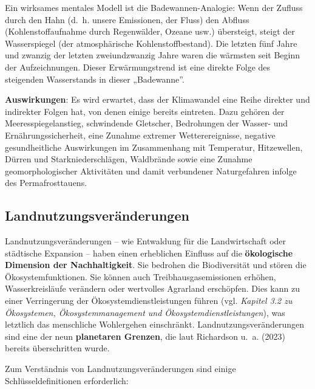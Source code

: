 \documentclass[
  nswissgerman,
  a4paper,
  openany]{book}
\begin{document}
Ein wirksames mentales Modell ist die Badewannen-Analogie: Wenn der
Zufluss durch den Hahn (d.~h. unsere Emissionen, der Fluss) den Abfluss
(Kohlenstoffaufnahme durch Regenwälder, Ozeane usw.) übersteigt, steigt
der Wasserspiegel (der atmosphärische Kohlenstoffbestand). Die letzten
fünf Jahre und zwanzig der letzten zweiundzwanzig Jahre waren die
wärmsten seit Beginn der Aufzeichnungen. Dieser Erwärmungstrend ist eine
direkte Folge des steigenden Wasserstands in dieser „Badewanne''.

\textbf{Auswirkungen}: Es wird erwartet, dass der Klimawandel eine Reihe
direkter und indirekter Folgen hat, von denen einige bereits eintreten.
Dazu gehören der Meeresspiegelanstieg, schwindende Gletscher,
Bedrohungen der Wasser- und Ernährungssicherheit, eine Zunahme extremer
Wetterereignisse, negative gesundheitliche Auswirkungen im Zusammenhang
mit Temperatur, Hitzewellen, Dürren und Starkniederschlägen, Waldbrände
sowie eine Zunahme geomorphologischer Aktivitäten und damit verbundener
Naturgefahren infolge des Permafrosttauens.

\subsection{Landnutzungsveränderungen}\label{landnutzungsveruxe4nderungen}

Landnutzungsveränderungen -- wie Entwaldung für die Landwirtschaft oder
städtische Expansion -- haben einen erheblichen Einfluss auf die
\textbf{ökologische Dimension der Nachhaltigkeit}. Sie bedrohen die
Biodiversität und stören die Ökosystemfunktionen. Sie können auch
Treibhausgasemissionen erhöhen, Wasserkreisläufe verändern oder
wertvolles Agrarland erschöpfen. Dies kann zu einer Verringerung der
Ökosystemdienstleistungen führen (vgl. \emph{Kapitel 3.2 zu Ökosystemen,
Ökosystemmanagement und Ökosystemdienstleistungen}), was letztlich das
menschliche Wohlergehen einschränkt. Landnutzungsveränderungen sind eine
der neun \textbf{planetaren Grenzen}, die laut Richardson u.~a. (2023)
bereits überschritten wurde.

Zum Verständnis von Landnutzungsveränderungen sind einige
Schlüsseldefinitionen erforderlich:
\end{document}
